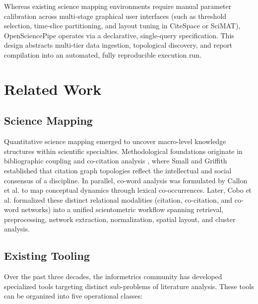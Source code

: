 \documentclass[preprint,12pt]{elsarticle}
\begin{document}
Whereas existing science mapping environments require manual parameter calibration across multi-stage graphical user interfaces (such as threshold selection, time-slice partitioning, and layout tuning in CiteSpace or SciMAT), OpenSciencePipe operates via a declarative, single-query specification. This design abstracts multi-tier data ingestion, topological discovery, and report compilation into an automated, fully reproducible execution run.

\section{Related Work}
\label{sec:related_work}

\subsection{Science Mapping}
Quantitative science mapping emerged to uncover macro-level knowledge structures within scientific specialties. Methodological foundations originate in bibliographic coupling \cite{kessler1963bibliographic} and co-citation analysis \cite{small1973co}, where Small and Griffith \cite{small1974structure} established that citation graph topologies reflect the intellectual and social consensus of a discipline. In parallel, co-word analysis was formulated by Callon et al. \cite{callon1983co} to map conceptual dynamics through lexical co-occurrences. Later, Cobo et al. \cite{cobo2011science, cobo2012scimat} formalized these distinct relational modalities (citation, co-citation, and co-word networks) into a unified scientometric workflow spanning retrieval, preprocessing, network extraction, normalization, spatial layout, and cluster analysis.

\subsection{Existing Tooling}
Over the past three decades, the informetrics community has developed specialized tools targeting distinct sub-problems of literature analysis. These tools can be organized into five operational classes:
\end{document}
